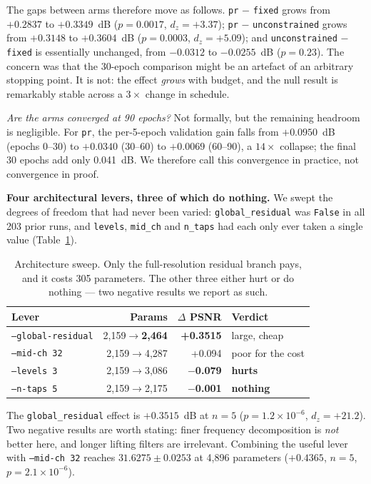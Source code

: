 \documentclass[conference]{IEEEtran}
\begin{document}
The gaps between arms therefore move as follows. \texttt{pr} $-$ \texttt{fixed}
grows from $+0.2837$ to $\mathbf{+0.3349}$~dB ($p=0.0017$, $d_z=+3.37$);
\texttt{pr} $-$ \texttt{unconstrained} grows from $+0.3148$ to
$\mathbf{+0.3604}$~dB ($p=0.0003$, $d_z=+5.09$); and
\texttt{unconstrained} $-$ \texttt{fixed} is essentially unchanged, from
$-0.0312$ to $-0.0255$~dB ($p=0.23$). The concern was that the 30-epoch
comparison might be an artefact of an arbitrary stopping point. It is not: the
effect \emph{grows} with budget, and the null result is remarkably stable across
a $3\times$ change in schedule.

\emph{Are the arms converged at 90 epochs?} Not formally, but the remaining
headroom is negligible. For \texttt{pr}, the per-5-epoch validation gain falls
from $+0.0950$~dB (epochs 0--30) to $+0.0340$ (30--60) to $+0.0069$ (60--90), a
$14\times$ collapse; the final 30 epochs add only 0.041~dB. We therefore call
this convergence in practice, not convergence in proof.

\textbf{Four architectural levers, three of which do nothing.} We swept the
degrees of freedom that had never been varied: \texttt{global\_residual} was
\texttt{False} in all 203 prior runs, and \texttt{levels}, \texttt{mid\_ch} and
\texttt{n\_taps} had each only ever taken a single value
(Table~\ref{tab:levers}).

\begin{table}[t]
\centering
\caption{Architecture sweep. Only the full-resolution residual branch pays, and
it costs 305 parameters. The other three either hurt or do nothing --- two
negative results we report as such.}
\label{tab:levers}
\small
\setlength{\tabcolsep}{3pt}
\begin{tabular}{@{}lrrl@{}}
\toprule
Lever & Params & $\Delta$ PSNR & Verdict\\
\midrule
\texttt{--global-residual} & 2,159$\to$\textbf{2,464} & \textbf{+0.3515} & large, cheap\\
\texttt{--mid-ch 32} & 2,159$\to$4,287 & +0.094 & poor for the cost\\
\texttt{--levels 3} & 2,159$\to$3,086 & \textbf{$-$0.079} & \textbf{hurts}\\
\texttt{--n-taps 5} & 2,159$\to$2,175 & \textbf{$-$0.001} & \textbf{nothing}\\
\bottomrule
\end{tabular}
\end{table}

The \texttt{global\_residual} effect is $+0.3515$~dB at $n=5$
($p=1.2\times10^{-6}$, $d_z=+21.2$). Two negative results are worth stating:
finer frequency decomposition is \emph{not} better here, and longer lifting
filters are irrelevant. Combining the useful lever with \texttt{--mid-ch 32}
reaches $31.6275 \pm 0.0253$ at 4,896 parameters ($+0.4365$, $n=5$,
$p=2.1\times10^{-6}$).
\end{document}
